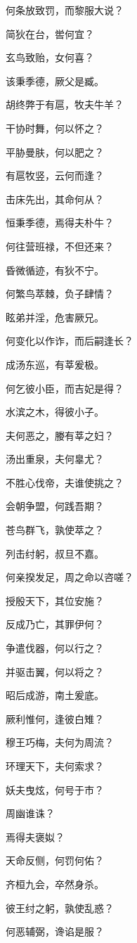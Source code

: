 \documentclass[12pt,a4paper]{ctexbook}
\begin{document}
何条放致罚，而黎服大说？\par
简狄在台，喾何宜？\par
玄鸟致贻，女何喜？\par
该秉季德，厥父是臧。\par
胡终弊于有扈，牧夫牛羊？\par
干协时舞，何以怀之？\par
平胁曼肤，何以肥之？\par
有扈牧竖，云何而逢？\par
击床先出，其命何从？\par
恒秉季德，焉得夫朴牛？\par
何往营班禄，不但还来？\par
昏微循迹，有狄不宁。\par
何繁鸟萃棘，负子肆情？\par
眩弟并淫，危害厥兄。\par
何变化以作诈，而后嗣逢长？\par
成汤东巡，有莘爰极。\par
何乞彼小臣，而吉妃是得？\par
水滨之木，得彼小子。\par
夫何恶之，媵有莘之妇？\par
汤出重泉，夫何辠尤？\par
不胜心伐帝，夫谁使挑之？\par
会朝争盟，何践吾期？\par
苍鸟群飞，孰使萃之？\par
列击纣躬，叔旦不嘉。\par
何亲揆发足，周之命以咨嗟？\par
授殷天下，其位安施？\par
反成乃亡，其罪伊何？\par
争遣伐器，何以行之？\par
并驱击翼，何以将之？\par
昭后成游，南土爰底。\par
厥利惟何，逢彼白雉？\par
穆王巧梅，夫何为周流？\par
环理天下，夫何索求？\par
妖夫曳炫，何号于市？\par
周幽谁诛？\par
焉得夫褒姒？\par
天命反侧，何罚何佑？\par
齐桓九会，卒然身杀。\par
彼王纣之躬，孰使乱惑？\par
何恶辅弼，谗谄是服？\par
\end{document}
